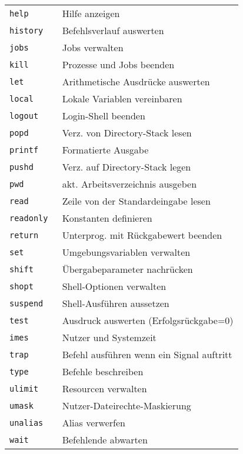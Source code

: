 \documentclass[landscape,letter,10pt]{article}
\begin{document}
\begin{multicols}{3}
\begin{tabular}{@{}ll@{}}
\texttt{help } & Hilfe anzeigen  \\
\texttt{history } & Befehlsverlauf auswerten  \\
\texttt{jobs } & Jobs verwalten  \\
\texttt{kill } & Prozesse und Jobs beenden  \\
\texttt{let } & Arithmetische Ausdrücke auswerten  \\
\texttt{local } & Lokale Variablen vereinbaren  \\
\texttt{logout } & Login-Shell beenden  \\
\texttt{popd } & Verz. von Directory-Stack lesen  \\
\texttt{printf } &  Formatierte Ausgabe \\
\texttt{pushd } & Verz. auf Directory-Stack legen  \\
\texttt{pwd } & akt. Arbeitsverzeichnis ausgeben  \\
\texttt{read } &  Zeile von der Standardeingabe lesen \\
\texttt{readonly } & Konstanten definieren  \\
\texttt{return } & Unterprog. mit Rückgabewert beenden \\
\texttt{set } & Umgebungsvariablen verwalten  \\
\texttt{shift } & Übergabeparameter nachrücken \\
\texttt{shopt } & Shell-Optionen verwalten  \\
\texttt{suspend } & Shell-Ausführen aussetzen  \\
\texttt{test } & Ausdruck auswerten (Erfolgsrückgabe=0) \\
\texttt{imes } & Nutzer und Systemzeit  \\
\texttt{trap } & Befehl ausführen wenn ein Signal auftritt  \\
\texttt{type } &  Befehle beschreiben \\
\texttt{ulimit } & Resourcen verwalten  \\
\texttt{umask } & Nutzer-Dateirechte-Maskierung \\
\texttt{unalias } & Alias verwerfen  \\
\texttt{wait } &  Befehlende abwarten 
\end{tabular}



\end{multicols}
\end{document}
